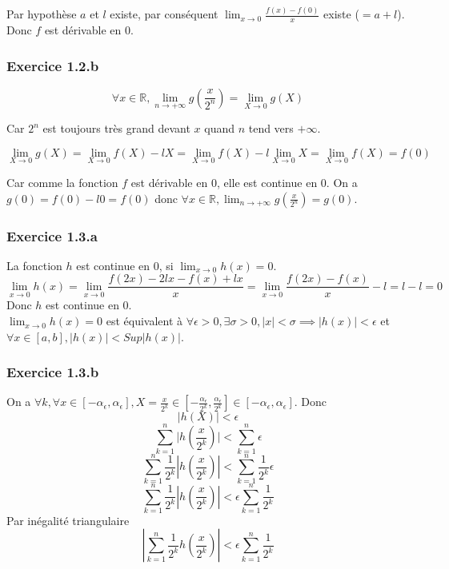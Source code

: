 \documentclass[]{book}
\theoremstyle{definition}
\newcommand{\bb}[1]{\mathbb{#1}}
\newcommand{\R}{\bb{R}}
\begin{document}
Par hypoth\`ese $a$ et $l$ existe, par cons\'equent $\lim_{x \to 0} \frac{f(x)- f(0)}{x}$ existe ($= a+l$). Donc $f$ est d\'erivable en 0.

\subsubsection*{Exercice 1.2.b}
$$\forall x \in \R, \lim_{n \to +\infty}g\left(\frac{x}{2^n}\right) = \lim_{X \to 0}g(X)$$

Car $2^n$ est toujours tr\`es grand devant $x$ quand $n$ tend vers $+\infty$.
  
$$\lim_{X \to 0}g(X) = \lim_{X \to 0} f(X) - lX = \lim_{X \to 0} f(X) - l\lim_{X \to 0}X = \lim_{X \to 0} f(X) = f(0)$$

Car comme la fonction $f$ est d\'erivable en 0, elle est continue en 0.
On a $g(0) = f(0) - l0 = f(0)$ donc $\forall x \in \R, \lim_{n \to +\infty}g\left(\frac{x}{2^n}\right) = g(0)$.

\subsubsection*{Exercice 1.3.a}
La fonction $h$ est continue en 0, si $\lim_{x \to 0} h(x) = 0$.
$$\lim_{x \to 0}h(x) = \lim_{x \to 0}\frac{f(2x)-2lx - f(x) + lx}{x} = \lim_{x \to 0}\frac{f(2x) - f(x)}{x} - l = l - l = 0$$
Donc $h$ est continue en 0.\\

$\lim_{x \to 0}h(x) = 0$ est \'equivalent \`a $\forall \epsilon > 0, \exists \sigma > 0, |x|<\sigma \implies |h(x)| < \epsilon$ et $\forall x \in [a,b], |h(x)| < Sup|h(x)|$. \\

\subsubsection*{Exercice 1.3.b}

On a $\forall k, \forall x \in [-\alpha_{\epsilon}, \alpha_{\epsilon}], X = 
\frac{x}{2^k} \in [-\frac{\alpha_{\epsilon}}{2^k}, \frac{\alpha_{\epsilon}}{2^k}] \in [-\alpha_{\epsilon}, \alpha_{\epsilon}]$. Donc
$$|h(X)| < \epsilon$$
$$\sum_{k=1}^{n}{|h(\frac{x}{2^k})}| < \sum_{k=1}^{n}{\epsilon}$$
$$\sum_{k=1}^{n}{\frac{1}{2^k}|h(\frac{x}{2^k})|} < \sum_{k=1}^{n}{\frac{1}{2^k} \epsilon}$$
$$\sum_{k=1}^{n}{\frac{1}{2^k}|h(\frac{x}{2^k})|} < \epsilon \sum_{k=1}^{n}{\frac{1}{2^k}}$$
Par in\'egalit\'e triangulaire
$$|\sum_{k=1}^{n}{\frac{1}{2^k}h(\frac{x}{2^k})}| < \epsilon \sum_{k=1}^{n}{\frac{1}{2^k}}$$
\end{document}
